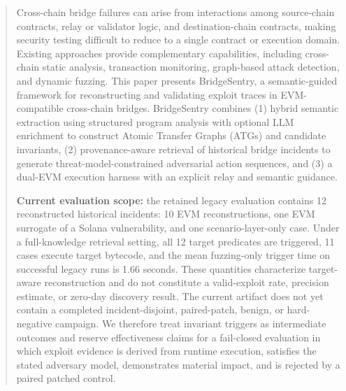 
\begin{abstract}
Cross-chain bridge failures can arise from interactions among source-chain contracts, relay or validator logic, and destination-chain contracts, making security testing difficult to reduce to a single contract or execution domain. Existing approaches provide complementary capabilities, including cross-chain static analysis, transaction monitoring, graph-based attack detection, and dynamic fuzzing. This paper presents BridgeSentry, a semantic-guided framework for reconstructing and validating exploit traces in EVM-compatible cross-chain bridges. BridgeSentry combines (1) hybrid semantic extraction using structured program analysis with optional LLM enrichment to construct Atomic Transfer Graphs (ATGs) and candidate invariants, (2) provenance-aware retrieval of historical bridge incidents to generate threat-model-constrained adversarial action sequences, and (3) a dual-EVM execution harness with an explicit relay and semantic guidance.

\textbf{Current evaluation scope:} the retained legacy evaluation contains 12 reconstructed historical incidents: 10 EVM reconstructions, one EVM surrogate of a Solana vulnerability, and one scenario-layer-only case. Under a full-knowledge retrieval setting, all 12 target predicates are triggered, 11 cases execute target bytecode, and the mean fuzzing-only trigger time on successful legacy runs is 1.66 seconds. These quantities characterize target-aware reconstruction and do not constitute a valid-exploit rate, precision estimate, or zero-day discovery result. The current artifact does not yet contain a completed incident-disjoint, paired-patch, benign, or hard-negative campaign. We therefore treat invariant triggers as intermediate outcomes and reserve effectiveness claims for a fail-closed evaluation in which exploit evidence is derived from runtime execution, satisfies the stated adversary model, demonstrates material impact, and is rejected by a paired patched control.
\end{abstract}
